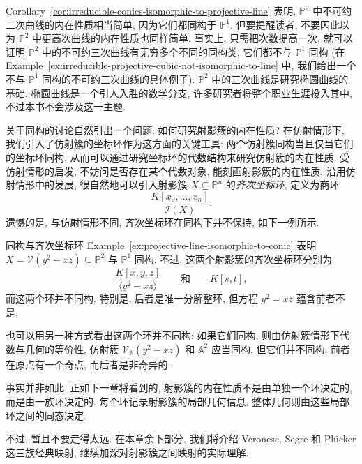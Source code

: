 Corollary~\ref{cor:irreducible-conics-isomorphic-to-projective-line} 表明, $\mathbb{P}^{2}$ 中不可约二次曲线的内在性质相当简单, 因为它们都同构于 $\mathbb{P}^{1}$. 但要提醒读者, 不要因此以为 $\mathbb{P}^{2}$ 中更高次曲线的内在性质也同样简单. 事实上, 只需把次数提高一次, 就可以证明 $\mathbb{P}^{2}$ 中的不可约三次曲线有无穷多个不同的同构类, 它们都不与 $\mathbb{P}^{1}$ 同构 (在 Example~\ref{ex:irreducible-projective-cubic-not-isomorphic-to-line} 中, 我们给出一个不与 $\mathbb{P}^{1}$ 同构的不可约三次曲线的具体例子). $\mathbb{P}^{2}$ 中的三次曲线是研究椭圆曲线的基础. 椭圆曲线是一个引人入胜的数学分支, 许多研究者将整个职业生涯投入其中, 不过本书不会涉及这一主题.

关于同构的讨论自然引出一个问题: 如何研究射影簇的内在性质? 在仿射情形下, 我们引入了仿射簇的坐标环作为这方面的关键工具: 两个仿射簇同构当且仅当它们的坐标环同构, 从而可以通过研究坐标环的代数结构来研究仿射簇的内在性质. 受仿射情形的启发, 不妨问是否存在某个代数对象, 能刻画射影簇的内在性质. 沿用仿射情形中的发展, 很自然地可以引入射影簇 $X\subseteq\mathbb{P}^{n}$ 的\emph{齐次坐标环}, 定义为商环
\[
  \frac{K[x_{0},\ldots,x_{n}]}{\mathcal{I}(X)}.
\]
遗憾的是, 与仿射情形不同, 齐次坐标环在同构下并不保持, 如下一例所示.

\begin{Example}{同构与齐次坐标环}\leavevmode\label{ex:isomorphism-does-not-preserve-homogeneous-coordinate-ring}
Example~\ref{ex:projective-line-isomorphic-to-conic} 表明 $X=\mathcal{V}(y^{2}-xz)\subseteq\mathbb{P}^{2}$ 与 $\mathbb{P}^{1}$ 同构. 不过, 这两个射影簇的齐次坐标环分别为
\[
  \frac{K[x,y,z]}{\langle y^{2}-xz\rangle}
  \qquad\text{和}\qquad K[s,t],
\]
而这两个环并不同构. 特别是, 后者是唯一分解整环, 但方程 $y^{2}=xz$ 蕴含前者不是.

也可以用另一种方式看出这两个环并不同构: 如果它们同构, 则由仿射簇情形下代数与几何的等价性, 仿射簇 $\mathcal{V}_{\mathbb{A}}(y^{2}-xz)$ 和 $\mathbb{A}^{2}$ 应当同构. 但它们并不同构: 前者在原点有一个奇点, 而后者是非奇异的.
\end{Example}

事实并非如此. 正如下一章将看到的, 射影簇的内在性质不是由单独一个环决定的, 而是由一族环决定的. 每个环记录射影簇的局部几何信息, 整体几何则由这些局部环之间的同态决定.

不过, 暂且不要走得太远. 在本章余下部分, 我们将介绍 Veronese, Segre 和 Plücker 这三族经典映射, 继续加深对射影簇之间映射的实际理解.

